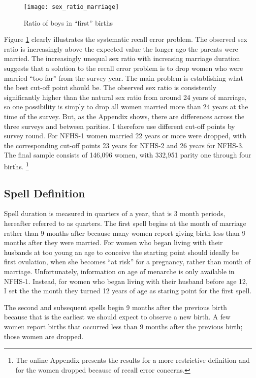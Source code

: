 \documentclass[12pt,letterpaper]{article}
\begin{document}
\begin{figure}[htp]%
\centering
\texttt{[image: sex\_ratio\_marriage]}
\caption{Ratio of boys in ``first'' births}
\label{fig:sexRatioMarriage}
\end{figure}


Figure \ref{fig:sexRatioMarriage} clearly illustrates the systematic recall error
problem.
The observed sex ratio is increasingly above the expected value the
longer ago the parents were married.
The increasingly unequal sex ratio with increasing marriage duration suggests that
a solution to the recall error problem is to drop women who were married ``too far'' from 
the survey year.
The main problem is establishing what the best cut-off point should be.
The observed sex ratio is consistently significantly higher than the natural sex ratio 
from around 24 years of marriage, so one possibility is simply to drop all women married 
more than 24 years at the time of the survey.
But, as the Appendix shows, there are differences across the three surveys and between 
parities.
I therefore use different cut-off points by survey round.
For NFHS-1 women married 22 years or more were dropped, with the corresponding cut-off 
points 23 years for NFHS-2  and 26 years for NFHS-3.
The final sample consists of 146,096 women, with 332,951 parity one through four births.%
\footnote{
The online Appendix presents the results for a more restrictive definition and for the
women dropped because of recall error concerns.
}


\subsection{Spell Definition\label{sec:spell_def}}

Spell duration is measured in quarters of a year, that is 3 month periods, hereafter
referred to as quarters.
The first spell begins at the month of marriage rather than 9 months after because many 
women report giving birth less than 9 months after they were married.
For women who began living with their husbands at too young an age to conceive the 
starting point should ideally be first ovulation, when she becomes ``at risk'' for a 
pregnancy, rather than month of marriage.
Unfortunately, information on age of menarche is only available in NFHS-1.
Instead, for women who began living with their husband before age 12, I set the 
the month they turned 12 years of age as staring point for the first spell.

The second and subsequent spells begin 9 months after the previous birth 
because that is the earliest we should expect to observe a new birth.
A few women report births that occurred less than 9 months 
after the previous birth; those women are dropped.
\end{document}
